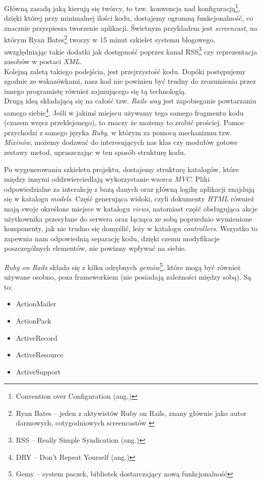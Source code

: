 \documentclass[a4paper,12pt]{article}
\begin{document}
Główną zasadą jaką kierują się twórcy, to tzw. konwencja nad
konfiguracją\footnote{Convention over Configuration (ang.)}, dzięki której przy minimalnej
ilości kodu, dostajemy ogromną funkcjonalność, co znacznie przyspiesza tworzenie
aplikacji. Świetnym przykładem jest \emph{screencast}, na którym Ryan
Bates\footnote{Ryan Bates -- jeden z aktywistów Ruby on Rails, znany głównie jako autor
darmowych, cotygodniowych screencastów \cite{ryan-bates}} tworzy w 15 minut szkielet
systemu blogowego, uwzględniając takie dodatki jak dostępność poprzez kanał
RSS\footnote{RSS -- Really Simple Syndication (ang.)} czy reprezentacja zasobów w postaci
\emph{XML}.\cite{blog-in-15-min}\\
Kolejną zaletą takiego podejścia, jest przejrzystość kodu. Dopóki postępujemy zgodnie ze
wskazówkami, nasz kod nie powinien być trudny do zrozumienia przez innego programistę
również zajmującego się tą technologią.\\
Drugą ideą składającą się na całość tzw. \emph{Rails way} jest zapobieganie powtarzaniu
samego siebie\footnote{DRY -- Don't Repeat Yourself (ang.)}. Jeśli w jakimś miejscu używamy
tego samego fragmentu kodu (czasem wręcz przeklejonego), to znaczy że możemy to zrobić
prościej. Pomoc przychodzi z samego języka \emph{Ruby}, w którym za pomocą mechanizmu
tzw. \emph{Mixinów}, możemy dodawać do interesujących nas klas czy modułów gotowe zestawy
metod, upraszczając w ten sposób strukturę kodu.


Po wygenerowaniu szkieletu projektu, dostajemy strukturę katalogów, które między innymi
oddzwierciedlają wykorzystanie wzorca \emph{MVC}. Pliki odpowiedzialne za interakcję z
bazą danych oraz główną logikę aplikacji znajdują się w katalogu \emph{models}. Część
generująca widoki, czyli dokumenty \emph{HTML} również mają swoje określone miejsce w
katalogu \emph{views}, natomiast część obsługująca akcje użytkownika przesyłane do serwera
oraz łącząca ze sobą poprzednio wymienione komponenty, jak nie trudno się domyślić, leży w
katalogu \emph{controllers}. Wszystko to zapewnia nam odpowiednią separację kodu, dzięki
czemu modyfikacje poszczególnych elementów, nie powinny wpływać na siebie.


\emph{Ruby on Rails} składa się z kilku odrębnych \emph{gemów}\footnote{Gemy -- system
paczek, bibliotek dostarczający nową funkcjonalność}, które mogą być również używane
osobno, poza frameworkiem (nie posiadają zależności między sobą). Są to:
\begin{itemize}
  \item ActionMailer
  \item ActionPack
  \item ActiveRecord
  \item ActiveResource
  \item ActiveSupport
\end{itemize}
\end{document}
